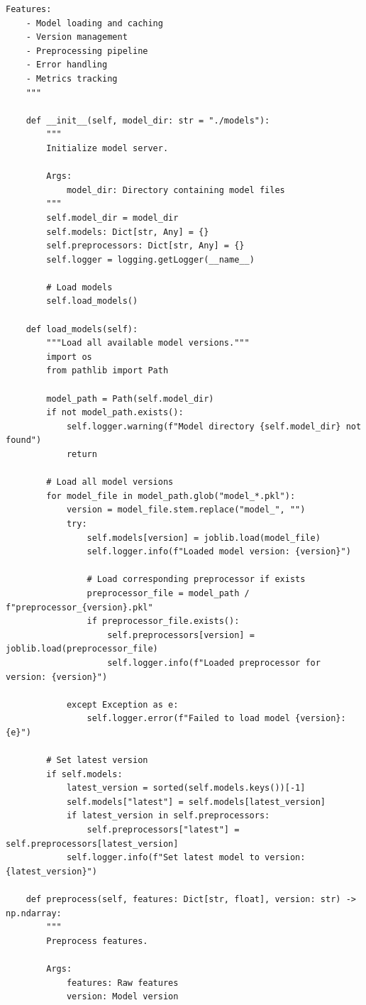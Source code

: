 \begin{lstlisting}[style=python, caption={Production-Grade FastAPI Model Serving}]
    Features:
    - Model loading and caching
    - Version management
    - Preprocessing pipeline
    - Error handling
    - Metrics tracking
    """

    def __init__(self, model_dir: str = "./models"):
        """
        Initialize model server.

        Args:
            model_dir: Directory containing model files
        """
        self.model_dir = model_dir
        self.models: Dict[str, Any] = {}
        self.preprocessors: Dict[str, Any] = {}
        self.logger = logging.getLogger(__name__)

        # Load models
        self.load_models()

    def load_models(self):
        """Load all available model versions."""
        import os
        from pathlib import Path

        model_path = Path(self.model_dir)
        if not model_path.exists():
            self.logger.warning(f"Model directory {self.model_dir} not found")
            return

        # Load all model versions
        for model_file in model_path.glob("model_*.pkl"):
            version = model_file.stem.replace("model_", "")
            try:
                self.models[version] = joblib.load(model_file)
                self.logger.info(f"Loaded model version: {version}")

                # Load corresponding preprocessor if exists
                preprocessor_file = model_path / f"preprocessor_{version}.pkl"
                if preprocessor_file.exists():
                    self.preprocessors[version] = joblib.load(preprocessor_file)
                    self.logger.info(f"Loaded preprocessor for version: {version}")

            except Exception as e:
                self.logger.error(f"Failed to load model {version}: {e}")

        # Set latest version
        if self.models:
            latest_version = sorted(self.models.keys())[-1]
            self.models["latest"] = self.models[latest_version]
            if latest_version in self.preprocessors:
                self.preprocessors["latest"] = self.preprocessors[latest_version]
            self.logger.info(f"Set latest model to version: {latest_version}")

    def preprocess(self, features: Dict[str, float], version: str) -> np.ndarray:
        """
        Preprocess features.

        Args:
            features: Raw features
            version: Model version


\end{lstlisting}
